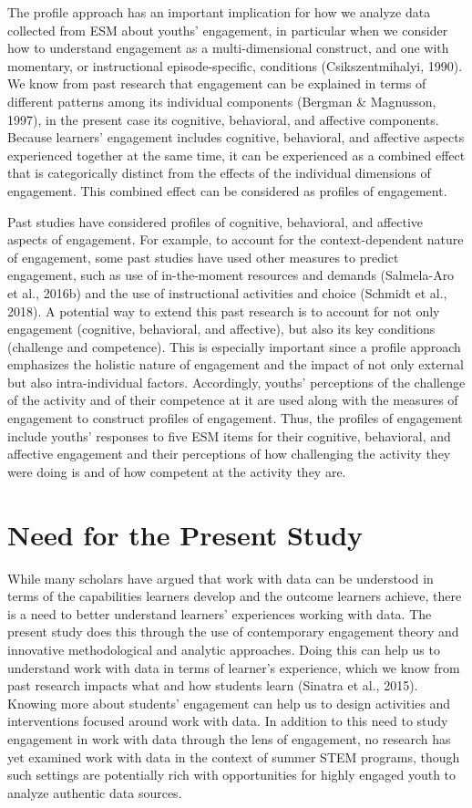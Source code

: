 \documentclass[]{msu-thesis}
\theoremstyle{definition}
\theoremstyle{definition}
\theoremstyle{definition}
\theoremstyle{remark}
\begin{document}
The profile approach has an important implication for how we analyze
data collected from ESM about youths' engagement, in particular when we
consider how to understand engagement as a multi-dimensional construct,
and one with momentary, or instructional episode-specific, conditions
(Csikszentmihalyi, 1990). We know from past research that engagement can
be explained in terms of different patterns among its individual
components (Bergman \& Magnusson, 1997), in the present case its
cognitive, behavioral, and affective components. Because learners'
engagement includes cognitive, behavioral, and affective aspects
experienced together at the same time, it can be experienced as a
combined effect that is categorically distinct from the effects of the
individual dimensions of engagement. This combined effect can be
considered as profiles of engagement.

Past studies have considered profiles of cognitive, behavioral, and
affective aspects of engagement. For example, to account for the
context-dependent nature of engagement, some past studies have used
other measures to predict engagement, such as use of in-the-moment
resources and demands (Salmela-Aro et al., 2016b) and the use of
instructional activities and choice (Schmidt et al., 2018). A potential
way to extend this past research is to account for not only engagement
(cognitive, behavioral, and affective), but also its key conditions
(challenge and competence). This is especially important since a profile
approach emphasizes the holistic nature of engagement and the impact of
not only external but also intra-individual factors. Accordingly,
youths' perceptions of the challenge of the activity and of their
competence at it are used along with the measures of engagement to
construct profiles of engagement. Thus, the profiles of engagement
include youths' responses to five ESM items for their cognitive,
behavioral, and affective engagement and their perceptions of how
challenging the activity they were doing is and of how competent at the
activity they are.

\section{Need for the Present Study}\label{need-for-the-present-study}

While many scholars have argued that work with data can be understood in
terms of the capabilities learners develop and the outcome learners
achieve, there is a need to better understand learners' experiences
working with data. The present study does this through the use of
contemporary engagement theory and innovative methodological and
analytic approaches. Doing this can help us to understand work with data
in terms of learner's experience, which we know from past research
impacts what and how students learn (Sinatra et al., 2015). Knowing more
about students' engagement can help us to design activities and
interventions focused around work with data. In addition to this need to
study engagement in work with data through the lens of engagement, no
research has yet examined work with data in the context of summer STEM
programs, though such settings are potentially rich with opportunities
for highly engaged youth to analyze authentic data sources.
\end{document}
